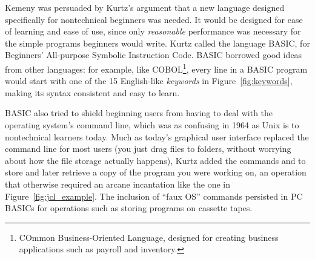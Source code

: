Kemeny was persuaded by Kurtz's argument that a new language 
designed specifically for nontechnical beginners was needed.
It would be designed for ease of learning
and ease of use, since only \emph{reasonable} performance was necessary
for the simple programs beginners would write.
Kurtz called the language BASIC, for Beginners' All-purpose Symbolic
Instruction Code.
BASIC  borrowed good ideas from other languages:
for example, like COBOL\footnote{COmmon Business-Oriented Language, designed for creating
business applications such as payroll and inventory.}, every line in a BASIC
program would start with one of the 15 English-like \emph{keywords} in
Figure~\ref{fig:keywords},
making its syntax consistent and easy
to learn.


BASIC also tried to shield beginning users from having to deal with
the operating system's command line, which was as confusing in 1964 as Unix is to
nontechnical learners today.
Much as today's graphical user interface replaced the command line for
most users (you just drag files to folders, without worrying about how
the file storage actually happens), Kurtz added the commands
 and  to store and later retrieve a copy of the
program you were working on, an operation that otherwise required
an arcane incantation 
like the one in Figure~\ref{fig:jcl_example}.
The inclusion of ``faux OS'' commands persisted in PC BASICs
for operations such as storing programs on cassette tapes.


